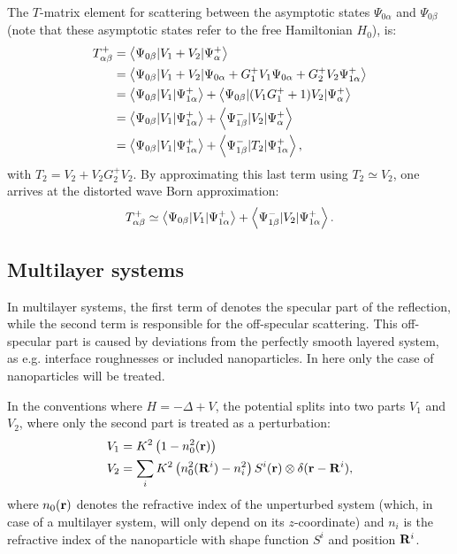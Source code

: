 The $T$-matrix element for scattering between the asymptotic states $\Psi_{0\alpha}$ and $\Psi_{0\beta}$ (note that these asymptotic states refer to the free Hamiltonian $H_0$), is:
\begin{align*}
  T^+_{\alpha\beta} &= \left\langle \Psi_{0\beta} \vert V_1+V_2 \vert \Psi^+_\alpha \right\rangle \nonumber \\
  & = \left\langle \Psi_{0\beta} \vert V_1+V_2 \vert \Psi_{0\alpha} + G^+_1V_1\Psi_{0\alpha} + G^+_2V_2\Psi^+_{1\alpha} \right\rangle \nonumber \\
  & = \left\langle \Psi_{0\beta} \vert V_1 \vert \Psi^+_{1\alpha} \right\rangle + \left\langle \Psi_{0\beta} \vert (V_1G^+_1 + 1)V_2 \vert \Psi^+_\alpha \right\rangle \\
  & = \left\langle \Psi_{0\beta} \vert V_1 \vert \Psi^+_{1\alpha} \right\rangle + \left\langle \Psi^-_{1\beta} \vert V_2 \vert \Psi^+_\alpha \right\rangle \nonumber \\
  & = \left\langle \Psi_{0\beta} \vert V_1 \vert \Psi^+_{1\alpha} \right\rangle + \left\langle \Psi^-_{1\beta} \vert T_2 \vert \Psi^+_{1\alpha} \right\rangle,
\end{align*}
with $T_2 = V_2 + V_2G^+_2V_2$. By approximating this last term using $T_2 \simeq V_2$, one arrives at the distorted wave Born approximation:
\begin{equation}
  \label{eq:tdwba}
   T^+_{\alpha\beta} \simeq \left\langle \Psi_{0\beta} \vert V_1 \vert \Psi^+_{1\alpha} \right\rangle + \left\langle \Psi^-_{1\beta} \vert V_2 \vert \Psi^+_{1\alpha} \right\rangle.
\end{equation}


\subsection{Multilayer systems}

In multilayer systems, the first term of  denotes the specular part of the reflection, while the second term is responsible for the off-specular scattering. This off-specular part is caused by deviations from the perfectly smooth layered system, as e.g. interface roughnesses or included nanoparticles. In here only the case of nanoparticles will be treated.

In the conventions where $H=-\Delta + V$, the potential splits into two parts $V_1$ and $V_2$, where only the second part is treated as a perturbation:
\begin{align*}
  V_1 & = K^2\left( 1-n_0^2(\mathbf{r})\right)  \\
  V_2 & = \sum_i K^2\left( n_0^2(\mathbf{R}^i) - n_i^2 \right) S^i(\mathbf{r}) \otimes \delta(\mathbf{r}-\mathbf{R}^i),
\end{align*}
where $n_0(\mathbf{r})$ denotes the refractive index of the unperturbed system (which, in case of a multilayer system, will only depend on its $z$-coordinate) and $n_i$ is the refractive index of the nanoparticle with shape function $S^i$ and position $\mathbf{R}^i$.


